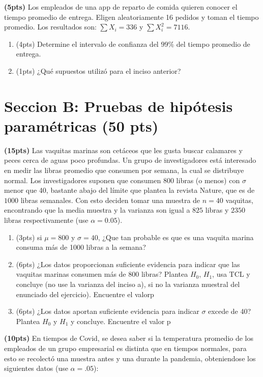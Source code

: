 \documentclass[addpoints]{exam}
\theoremstyle{mytheor}
\begin{document}
\begin{questions}
 \question \textbf{(5pts)} Los empleados de una app de reparto de comida quieren conocer el tiempo promedio de entrega. Eligen aleatoriamente 16 pedidos y toman el tiempo promedio. Los resultados son: $\sum X_i = 336$ y $\sum X_i^2 = 7116$. 
  
\begin{enumerate}[label=\Alph*)]
\item (4pts) Determine el intervalo de confianza del $99\%$ del tiempo promedio de entrega.
\item (1pts) ¿Qué supuestos utilizó para el inciso anterior?
\end{enumerate}
  
  

\section*{Seccion B: Pruebas de hipótesis paramétricas (50 pts)}

 \question \textbf{(15pts)} Las vaquitas marinas son cetáceos que les gusta buscar calamares y peces cerca de aguas poco profundas. Un grupo de investigadores está interesado en medir las libras promedio que consumen por semana, la cual se distribuye normal. Los investigadores suponen que consumen $800$ libras (o menos) con $\sigma$ menor que 40, bastante abajo del límite que plantea la revista Nature, que es de $1000$ libras semanales. Con esto deciden tomar una muestra de $n = 40$ vaquitas, encontrando que la media muestra y la varianza son igual a $825$ libras y $2350$ libras respectivamente (use $\alpha = 0.05$).
  
\begin{enumerate}[label=\Alph*)]
  \item  (3pts) si $\mu = 800$ y $\sigma = 40$, ¿Que tan probable es que es una vaquita marina consuma más de 1000 libras a la semana?
  \item (6pts) ¿Los datos proporcionan suficiente evidencia para indicar que las vaquitas marinas consumen más de 800 libras? Plantea $H_0$, $H_1$, usa TCL y concluye (no use la varianza del inciso a), si no la varianza muestral del enunciado del ejercicio). Encuentre el valorp
  \item (6pts) ¿Los datos aportan suficiente evidencia para indicar $\sigma$ excede de 40? Plantea $H_0$ y $H_1$ y concluye. Encuentre el valor p
  \end{enumerate}
  
  \question \textbf{(10pts)} En tiempos de Covid, se desea saber si la temperatura promedio de los empleados de un grupo empresarial es distinta que en tiempos normales, para esto se recolectó una muestra antes y una durante la pandemia, obteniendose los siguientes datos (use $\alpha = .05$):


\end{questions}
\end{document}
